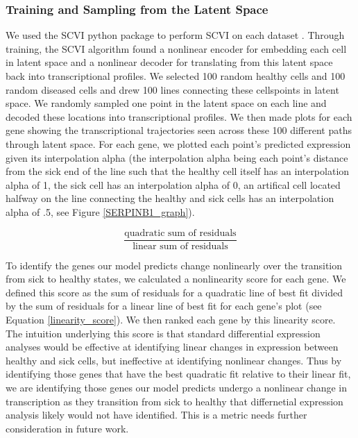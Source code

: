 \documentclass{article}
\begin{document}
\subsubsection{Training and Sampling from the Latent Space}
We used the SCVI python package to perform SCVI on each dataset \citep{lopez_deep_2018}.
Through training, the SCVI algorithm found a nonlinear encoder for embedding each cell in latent space and a nonlinear decoder for translating from this latent space back into transcriptional profiles.
We selected 100 random healthy cells and 100 random diseased cells and drew 100 lines connecting these cells\textquotesingle points in latent space.
We randomly sampled one point in the latent space on each line and decoded these locations into transcriptional profiles.
We then made plots for each gene showing the transcriptional trajectories seen across these 100 different paths through latent space.
For each gene, we plotted each point's predicted expression given its interpolation alpha (the interpolation alpha being each point's distance from the sick end of the line such that the healthy cell itself has an interpolation alpha of 1, the sick cell has an interpolation alpha of 0, an artifical cell located halfway on the line connecting the healthy and sick cells has an interpolation alpha of .5, see Figure \ref{SERPINB1_graph}).

\begin{equation}
  \label{linearity_score}
  \frac{\text{quadratic sum of residuals}}{\text{linear sum of residuals}}
\end{equation}

To identify the genes our model predicts change nonlinearly over the transition from sick to healthy states, we calculated a nonlinearity score for each gene.
We defined this score as the sum of residuals for a quadratic line of best fit divided by the sum of residuals for a linear line of best fit for each gene's plot (see Equation \ref*{linearity_score}).
We then ranked each gene by this linearity score.
The intuition underlying this score is that standard differential expression analyses would be effective at identifying linear changes in expression between healthy and sick cells, but ineffective at identifying nonlinear changes.
Thus by identifying those genes that have the best quadratic fit relative to their linear fit, we are identifying those genes our model predicts undergo a nonlinear change in transcription as they transition from sick to healthy that differnetial expression analysis likely would not have identified.
This is a metric needs further consideration in future work.
\end{document}

